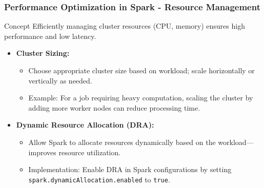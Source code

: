 \documentclass[aspectratio=169]{beamer}
\begin{document}
\begin{frame}[fragile]
    \frametitle{Performance Optimization in Spark - Resource Management}
    \begin{block}{Concept}
        Efficiently managing cluster resources (CPU, memory) ensures high performance and low latency.
    \end{block}
    
    \begin{itemize}
        \item \textbf{Cluster Sizing:}
        \begin{itemize}
            \item Choose appropriate cluster size based on workload; scale horizontally or vertically as needed.
            \item Example: For a job requiring heavy computation, scaling the cluster by adding more worker nodes can reduce processing time.
        \end{itemize}
        
        \item \textbf{Dynamic Resource Allocation (DRA):}
        \begin{itemize}
            \item Allow Spark to allocate resources dynamically based on the workload—improves resource utilization.
            \item Implementation: Enable DRA in Spark configurations by setting \texttt{spark.dynamicAllocation.enabled} to \texttt{true}.
        \end{itemize}
    \end{itemize}
\end{frame}
\end{document}
